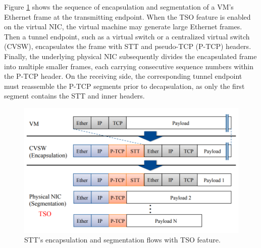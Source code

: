 Figure \ref{STT} shows the sequence of encapsulation and segmentation of a VM’s Ethernet frame at the transmitting endpoint. When the TSO feature is enabled on the virtual NIC, the virtual machine may generate large Ethernet frames. Then a tunnel endpoint, such as a virtual switch or a centralized virtual switch (CVSW), encapsulates the frame with STT and pseudo-TCP (P-TCP) headers. Finally, the underlying physical NIC subsequently divides the encapsulated frame into multiple smaller frames, each carrying consecutive sequence numbers within the P-TCP header. On the receiving side, the corresponding tunnel endpoint must reassemble the P-TCP segments prior to decapsulation, as only the first segment contains the STT and inner headers.

\begin{figure} [H]
    \centering
    \includegraphics[width=0.55\linewidth]{Figures/STT.png}
    \caption{STT's encapsulation and segmentation flows with TSO feature. \cite{kawashima2020stt}}
    \label{STT}
\end{figure}